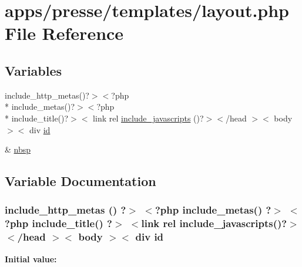 \hypertarget{presse_2templates_2layout_8php}{\section{apps/presse/templates/layout.php File Reference}
\label{presse_2templates_2layout_8php}
}
\subsection*{Variables}
\begin{DoxyCompactItemize}
\item 
include\-\_\-http\-\_\-metas()?$>$$<$?php \\*
include\-\_\-metas()?$>$$<$?php \\*
include\-\_\-title()?$>$$<$ link rel \hyperlink{presse_2templates_2layout_8php_a47feb3ae82d801315676f1bde1678c3e}{include\-\_\-javascripts} ()?$>$$<$/head $>$$<$ body $>$$<$ div \hyperlink{live_2modules_2team_2templates_2management_success_8php_ad9851c94d15b310fef9eaded57c23ddf}{id}
\item 
\& \hyperlink{presse_2templates_2layout_8php_aef915316f784c9063d942974538301a6}{nbsp}
\end{DoxyCompactItemize}


\subsection{Variable Documentation}
\hypertarget{presse_2templates_2layout_8php_a47feb3ae82d801315676f1bde1678c3e}{
\subsubsection[{include\-\_\-javascripts}]{\setlength{\rightskip}{0pt plus 5cm}include\-\_\-http\-\_\-metas () ?$>$ $<$?php include\-\_\-metas() ?$>$ $<$?php include\-\_\-title() ?$>$ $<$link rel include\-\_\-javascripts()?$>$$<$/head $>$$<$ body $>$$<$ div {\bf id}}}\label{presse_2templates_2layout_8php_a47feb3ae82d801315676f1bde1678c3e}
{\bfseries Initial value\-:}


